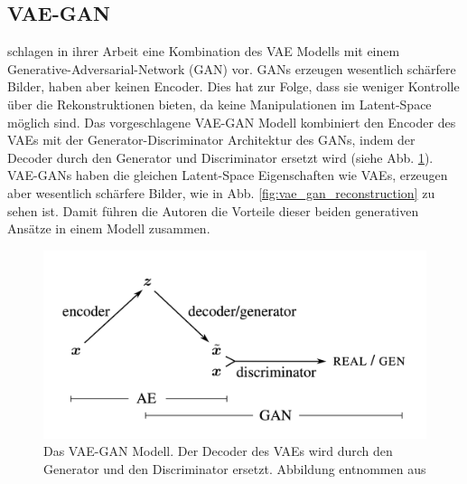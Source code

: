 \subsection{VAE-GAN}
\cite{Larsen2016} schlagen in ihrer Arbeit eine Kombination des VAE Modells mit einem Generative-Adversarial-Network (GAN) vor. GANs erzeugen wesentlich schärfere Bilder, haben aber keinen Encoder. Dies hat zur Folge, dass sie weniger Kontrolle über die Rekonstruktionen bieten, da keine Manipulationen im Latent-Space möglich sind. Das vorgeschlagene VAE-GAN Modell kombiniert den Encoder des VAEs mit der Generator-Discriminator Architektur des GANs, indem der Decoder durch den Generator und Discriminator ersetzt wird (siehe Abb. \ref{fig:vae_gan}). VAE-GANs haben die gleichen Latent-Space Eigenschaften wie VAEs, erzeugen aber wesentlich schärfere Bilder, wie in Abb. \ref{fig:vae_gan_reconstruction} zu sehen ist. Damit führen die Autoren die Vorteile dieser beiden generativen Ansätze in einem Modell zusammen.


\begin{figure}[hbt]
\centering
  \includegraphics[width=.7\textwidth]{gfx/outlook/vae_gan}
  \caption{Das VAE-GAN Modell. Der Decoder des VAEs wird durch den Generator und den Discriminator ersetzt. Abbildung entnommen aus \cite{Larsen2016}}
  \label{fig:vae_gan}
\end{figure}

